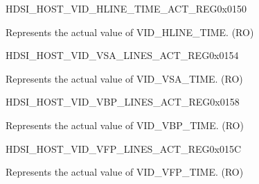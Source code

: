 \begin{register}{H}{DSI\_HOST\_VID\_HLINE\_TIME\_ACT\_REG}{0x0150}\label{regdesc:DSIHOSTVIDHLINETIMEACTREG}
%
%
\regnewline%
\begin{regdesc}\begin{reglist}
\label{fielddesc:DSIHOSTVIDHLINETIMEACT}\item [DSI\_HOST\_VID\_HLINE\_TIME\_ACT] Represents the actual value of VID\_HLINE\_TIME. (RO)
\end{reglist}\end{regdesc}
\end{register}


\begin{register}{H}{DSI\_HOST\_VID\_VSA\_LINES\_ACT\_REG}{0x0154}\label{regdesc:DSIHOSTVIDVSALINESACTREG}
%
%
\regnewline%
\begin{regdesc}\begin{reglist}
\label{fielddesc:DSIHOSTVSALINESACT}\item [DSI\_HOST\_VSA\_LINES\_ACT] Represents the actual value of VID\_VSA\_TIME. (RO)
\end{reglist}\end{regdesc}
\end{register}


\begin{register}{H}{DSI\_HOST\_VID\_VBP\_LINES\_ACT\_REG}{0x0158}\label{regdesc:DSIHOSTVIDVBPLINESACTREG}
%
%
\regnewline%
\begin{regdesc}\begin{reglist}
\label{fielddesc:DSIHOSTVBPLINESACT}\item [DSI\_HOST\_VBP\_LINES\_ACT] Represents the actual value of VID\_VBP\_TIME. (RO)
\end{reglist}\end{regdesc}
\end{register}


\begin{register}{H}{DSI\_HOST\_VID\_VFP\_LINES\_ACT\_REG}{0x015C}\label{regdesc:DSIHOSTVIDVFPLINESACTREG}
%
%
\regnewline%
\begin{regdesc}\begin{reglist}
\label{fielddesc:DSIHOSTVFPLINESACT}\item [DSI\_HOST\_VFP\_LINES\_ACT] Represents the actual value of VID\_VFP\_TIME. (RO)
\end{reglist}\end{regdesc}
\end{register}


